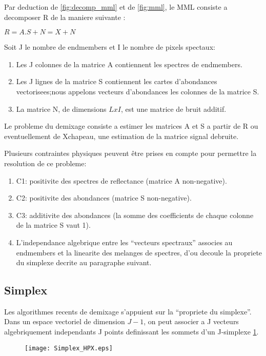 Par deduction de \ref{fig:decomp_mml} et de \ref{fig:mml}, le MML consiste a decomposer R
de la maniere suivante : 
\begin{center}
$R= A.S + N = X + N$
\end{center}

Soit J le nombre de endmembers et I le nombre de pixels spectaux: 
\begin{enumerate}
\item{Les J colonnes de la matrice A contiennent les spectres de endmembers.}
\item{Les J lignes de la matrice S contiennent les cartes d'abondances
vectorisees;nous appelons vecteurs d'abondances les colonnes de la
matrice S.}
\item{La matrice N, de dimensions $LxI$, est une matrice de bruit
additif.}
\end{enumerate}

   

Le probleme du demixage consiste a estimer les matrices A et S a
partir de R ou eventuellement de Xchapeau, une estimation de la matrice signal
debruite.

Plusieurs contraintes physiques peuvent être prises en
compte pour permettre la resolution de ce probleme: 
\begin{enumerate}
\item{C1: positivite
des spectres de reflectance (matrice A non-negative).}
\item{C2: positivite
des abondances (matrice S non-negative).}
\item{C3: additivite des
abondances (la somme des coefficients de chaque colonne de la matrice
S vaut 1).}
\item{L'independance algebrique entre les ``vecteurs spectraux''
associes au endmembers et la linearite des melanges de spectres, d'ou
decoule la propriete du simplexe decrite au paragraphe suivant.}
\end{enumerate}

\subsection{Simplex}  
Les algorithmes recents de demixage s'appuient sur la ``propriete du
simplexe''. Dans un espace vectoriel de dimension $J-1$, on peut
associer a J vecteurs algebriquement independants J points definissant
les sommets d'un J-simplexe \ref{fig:simplex}.

\begin{figure}[h]
  \centering
  \texttt{[image: Simplex\_HPX.eps]}
  \label{fig:simplex}
\end{figure}

